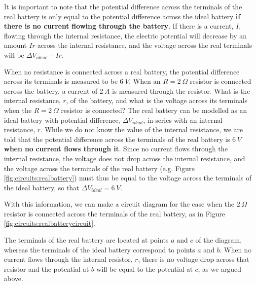 It is important to note that the potential difference across the terminals of the real battery is only equal to the potential difference across the ideal battery \textbf{if there is no current flowing through the battery}. If there is a current, $I$, flowing through the internal resistance, the electric potential will decrease by an amount $Ir$ across the internal resistance, and the voltage across the real terminals will be $\Delta V_{ideal}-Ir$. 
\vspace{-0.25cm}
\begin{example}{When no resistance is connected across a real battery, the potential difference across its terminals is measured to be $\SI{6}{V}$. When an $R=\SI{2}{\Omega}$ resistor is connected across the battery, a current of $\SI{2}{A}$ is measured through the resistor. What is the internal resistance, $r$, of the battery, and what is the voltage across its terminals when the $R=\SI{2}{\Omega}$ resistor is connected?}
The real battery can be modelled as an ideal battery with potential difference, $\Delta V_{ideal}$, in series with an internal resistance, $r$. While we do not know the value of the internal resistance, we are told that the potential difference across the terminals of the real battery is $\SI{6}{V}$ \textbf{when no current flows through it}. Since no current flows through the internal resistance, the voltage does not drop across the internal resistance, and the voltage across the terminals of the real battery (e.g. Figure \ref{fig:circuits:realbattery}) must thus be equal to the voltage across the terminals of the ideal battery, so that $\Delta V_{ideal}=\SI{6}{V}$.

With this information, we can make a circuit diagram for the case when the $\SI{2}{\Omega}$ resistor is connected across the terminals of the real battery, as in Figure \ref{fig:circuits:realbatterycircuit}.


The terminals of the real battery are located at points $a$ and $c$ of the diagram, whereas the terminals of the ideal battery correspond to points $a$ and $b$. When no current flows through the internal resistor, $r$, there is no voltage drop across that resistor and the potential at $b$ will be equal to the potential at $c$, as we argued above.


\end{example}
